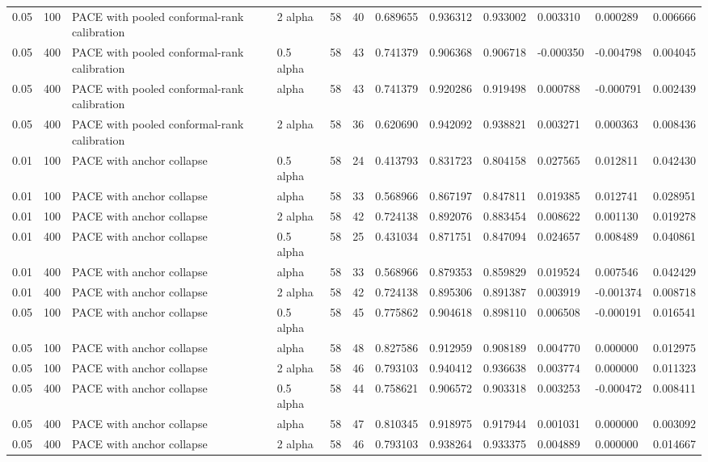 \begin{tabular}{llllllllllll}
0.05 & 100 & PACE with pooled conformal-rank calibration & 2 alpha & 58 & 40 & 0.689655 & 0.936312 & 0.933002 & 0.003310 & 0.000289 & 0.006666 \\
0.05 & 400 & PACE with pooled conformal-rank calibration & 0.5 alpha & 58 & 43 & 0.741379 & 0.906368 & 0.906718 & -0.000350 & -0.004798 & 0.004045 \\
0.05 & 400 & PACE with pooled conformal-rank calibration & alpha & 58 & 43 & 0.741379 & 0.920286 & 0.919498 & 0.000788 & -0.000791 & 0.002439 \\
0.05 & 400 & PACE with pooled conformal-rank calibration & 2 alpha & 58 & 36 & 0.620690 & 0.942092 & 0.938821 & 0.003271 & 0.000363 & 0.008436 \\
0.01 & 100 & PACE with anchor collapse & 0.5 alpha & 58 & 24 & 0.413793 & 0.831723 & 0.804158 & 0.027565 & 0.012811 & 0.042430 \\
0.01 & 100 & PACE with anchor collapse & alpha & 58 & 33 & 0.568966 & 0.867197 & 0.847811 & 0.019385 & 0.012741 & 0.028951 \\
0.01 & 100 & PACE with anchor collapse & 2 alpha & 58 & 42 & 0.724138 & 0.892076 & 0.883454 & 0.008622 & 0.001130 & 0.019278 \\
0.01 & 400 & PACE with anchor collapse & 0.5 alpha & 58 & 25 & 0.431034 & 0.871751 & 0.847094 & 0.024657 & 0.008489 & 0.040861 \\
0.01 & 400 & PACE with anchor collapse & alpha & 58 & 33 & 0.568966 & 0.879353 & 0.859829 & 0.019524 & 0.007546 & 0.042429 \\
0.01 & 400 & PACE with anchor collapse & 2 alpha & 58 & 42 & 0.724138 & 0.895306 & 0.891387 & 0.003919 & -0.001374 & 0.008718 \\
0.05 & 100 & PACE with anchor collapse & 0.5 alpha & 58 & 45 & 0.775862 & 0.904618 & 0.898110 & 0.006508 & -0.000191 & 0.016541 \\
0.05 & 100 & PACE with anchor collapse & alpha & 58 & 48 & 0.827586 & 0.912959 & 0.908189 & 0.004770 & 0.000000 & 0.012975 \\
0.05 & 100 & PACE with anchor collapse & 2 alpha & 58 & 46 & 0.793103 & 0.940412 & 0.936638 & 0.003774 & 0.000000 & 0.011323 \\
0.05 & 400 & PACE with anchor collapse & 0.5 alpha & 58 & 44 & 0.758621 & 0.906572 & 0.903318 & 0.003253 & -0.000472 & 0.008411 \\
0.05 & 400 & PACE with anchor collapse & alpha & 58 & 47 & 0.810345 & 0.918975 & 0.917944 & 0.001031 & 0.000000 & 0.003092 \\
0.05 & 400 & PACE with anchor collapse & 2 alpha & 58 & 46 & 0.793103 & 0.938264 & 0.933375 & 0.004889 & 0.000000 & 0.014667 \\

\end{tabular}
